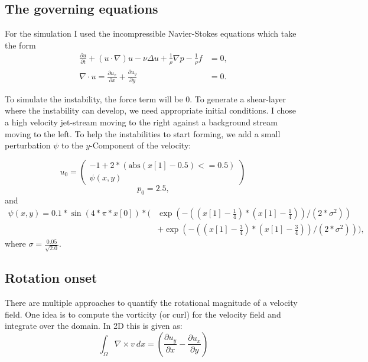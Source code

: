 \documentclass[a4paper,12pt]{article}
\begin{document}
\subsection{The governing equations}
For the simulation I used the incompressible Navier-Stokes equations which take the form
\begin{align}
  \frac{\partial u}{\partial t} + (u\cdot \nabla)u - \nu \Delta u + \frac{1}{\rho} \nabla p - \frac{1}{\rho} f &= 0,\\
  \nabla \cdot u = \frac{\partial u_x}{\partial x} + \frac{\partial u_y}{\partial y}  &= 0.
\end{align}

To simulate the instability, the force term will be 0.
To generate a shear-layer where the instability can develop, we need appropriate initial conditions.
I chose a high velocity jet-stream moving to the right against a background stream moving to the left.
To help the instabilities to start forming, we add a small perturbation $\psi$ to the $y$-Component of the velocity:

\begin{equation}
u_0 = \begin{pmatrix}-1 + 2 * (\text{abs}(x[1] - 0.5) <= 0.5)\\
        \psi(x,y)\end{pmatrix}\,
\end{equation}
\begin{equation}
        p_0 = 2.5,
\end{equation}
and
\begin{align*}
  \psi(x,y) = 0.1 * \sin(4 * \pi * x[0]) * \Bigg(&\exp\left(-\left(\left(x[1] - \frac{1}{4}\right) * \left(x[1] - \frac{1}{4}\right)\right) / \left(2 * \sigma^2\right)\right) \\
  &+ \exp\left(-\left(\left(x[1] - \frac{3}{4}\right) *\left(x[1] - \frac{3}{4}\right)\right) / \left(2 * \sigma^2\right)\right)\Bigg),
\end{align*}
where $\displaystyle \sigma = \frac{0.05}{\sqrt{2.0}}$.

\subsection{Rotation onset}
There are multiple approaches to quantify the rotational magnitude of a velocity field.
One idea is to compute the vorticity (or curl) for the velocity field and integrate over the domain. In 2D this is given as:
\begin{equation}
  \label{eq:curl}
  \int_{\Omega} \nabla \times v\ dx = \left(\frac{\partial u_y}{\partial x} - \frac{\partial u_x}{\partial y}\right)
\end{equation}
\end{document}
